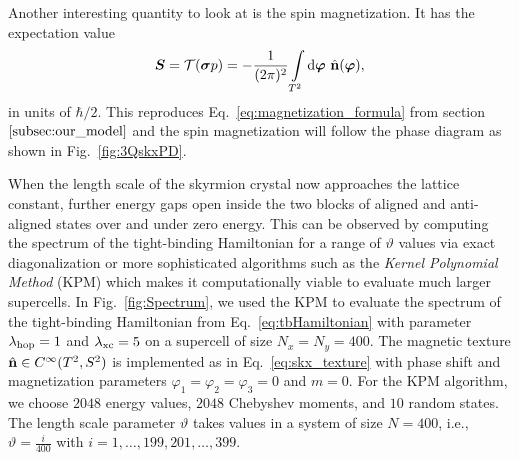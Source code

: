 \documentclass[submission, Phys]{SciPost}
\begin{document}
Another interesting quantity to look at is the spin magnetization. It has the expectation value
\begin{align}
    \boldsymbol{S} = \mathcal{T}(\boldsymbol{\sigma} p ) = -\frac{1}{(2\pi)^2}
    \int\limits_{T^2} \mathrm{d} \boldsymbol{\varphi}~ \hat{\mathbf{n}}(\boldsymbol{\varphi}),
\end{align}
in units of $\hbar/2$. 
This reproduces Eq.~\eqref{eq:magnetization_formula} from section $\ref{subsec:our_model}$ and the spin magnetization will follow the phase diagram as shown in Fig.~\ref{fig:3QskxPD}.

When the length scale of the skyrmion crystal now approaches the lattice constant, further energy gaps open inside the two blocks of aligned and anti-aligned states over and under zero energy.
This can be observed by computing the spectrum of the tight-binding Hamiltonian for a range of $\vartheta$ values via exact diagonalization or more sophisticated algorithms such as the \emph{Kernel Polynomial Method} (KPM) \cite{Weiße2006} which makes it computationally viable to evaluate much larger supercells.
In Fig.~\ref{fig:Spectrum}, we used the KPM to evaluate the spectrum of the tight-binding Hamiltonian from Eq.~\eqref{eq:tbHamiltonian} with parameter $\lambda_\mathrm{hop}=1$ and $\lambda_\mathrm{xc}=5$ on a supercell of size $N_x=N_y=400$. The magnetic texture $\hat{\mathbf{n}} \in C^\infty(T^2, S^2)$ is implemented as in Eq.~\eqref{eq:skx_texture} with phase shift and magnetization parameters $\varphi_1=\varphi_2=\varphi_3=0$ and $m=0$. 
For the KPM algorithm, we choose $2048$ energy values, $2048$ Chebyshev moments, and $10$ random states.
The length scale parameter $\vartheta$ takes values in a system of size $N=400$, i.e., $\vartheta=\frac{i}{400}$ with $i=1,\dots,199,201,\dots,399$.
\figureIII
\tableI
\end{document}

